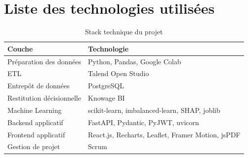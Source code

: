 \section{Liste des technologies utilisées}
\begin{table}[H]
\centering
\caption{Stack technique du projet}
\begin{tabular}{ll}
\toprule
\textbf{Couche} & \textbf{Technologie} \\
\midrule
Préparation des données & Python, Pandas, Google Colab \\
ETL & Talend Open Studio \\
Entrepôt de données & PostgreSQL \\
Restitution décisionnelle & Knowage BI \\
Machine Learning & scikit-learn, imbalanced-learn, SHAP, joblib \\
Backend applicatif & FastAPI, Pydantic, PyJWT, uvicorn \\
Frontend applicatif & React.js, Recharts, Leaflet, Framer Motion, jsPDF \\
Gestion de projet & Scrum \\
\bottomrule
\end{tabular}
\end{table}
